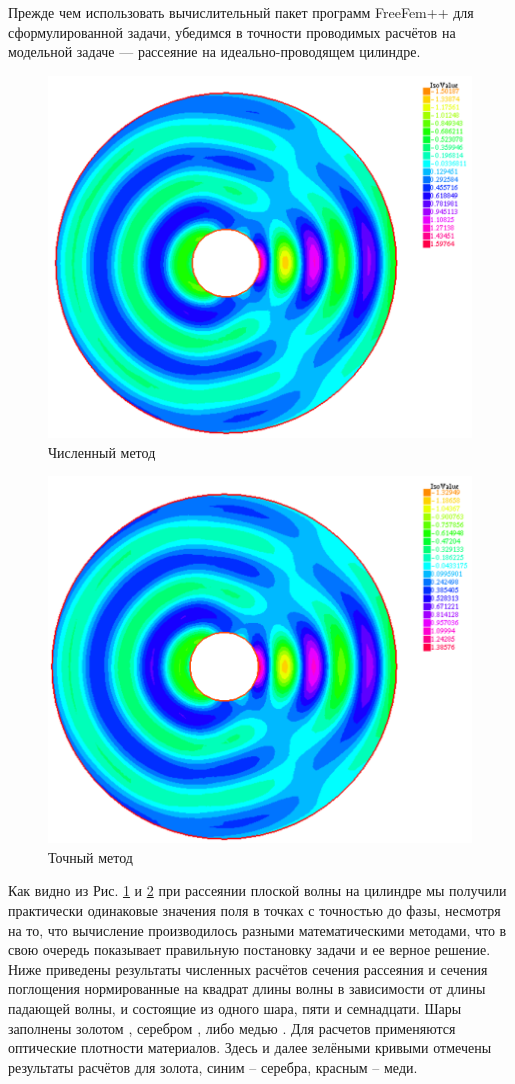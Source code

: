 Прежде чем использовать вычислительный пакет программ FreeFem++ для сформулированной задачи, убедимся в точности проводимых расчётов на модельной задаче --- рассеяние на идеально-проводящем цилиндре.
\begin{figure}[h!]
	\centering
	\includegraphics[width=0.8\linewidth]{sc1.png}
	\caption{Численный метод}
	\label{fig:sc1}
\end{figure} 
\newpage
\begin{figure}[h!]
	\centering
	\includegraphics[width=0.8\linewidth]{sc2.png}
	\caption{Точный метод}
	\label{fig:sc2}
\end{figure}
Как видно из Рис. \ref{fig:sc1} и \ref{fig:sc2} при рассеянии плоской волны на цилиндре мы получили практически одинаковые значения поля в точках с точностью до фазы, несмотря на то, что вычисление производилось разными математическими методами, что в свою очередь показывает правильную постановку задачи и ее верное решение. \\ 
Ниже приведены результаты численных расчётов сечения рассеяния и сечения поглощения нормированные на квадрат длины волны в зависимости от длины падающей волны, и состоящие из одного шара, пяти и семнадцати. Шары заполнены золотом \cite{Olmon2012}, серебром \cite{Yang2015}, либо медью \cite{Querry1985}. Для расчетов применяются оптические плотности материалов. Здесь и далее зелёными кривыми отмечены результаты расчётов для золота, синим – серебра, красным – меди.

